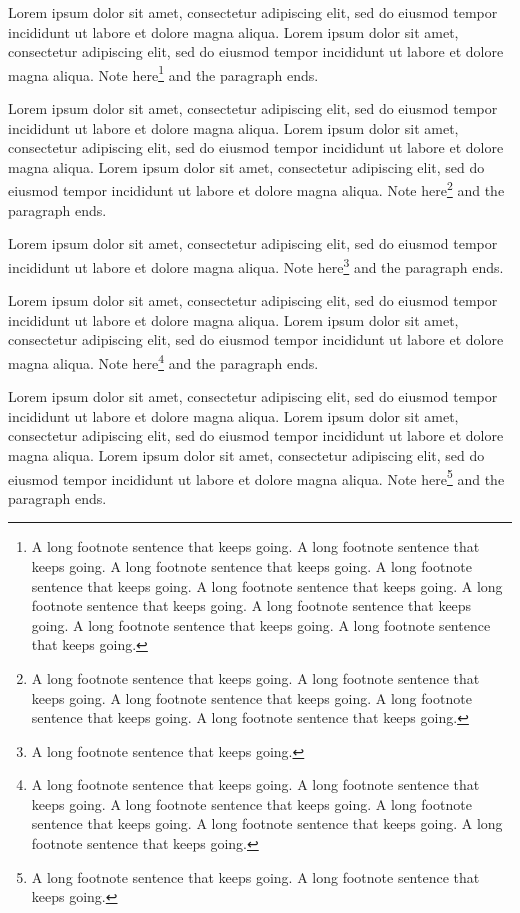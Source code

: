 \documentclass{article}
\begin{document}
Lorem ipsum dolor sit amet, consectetur adipiscing elit, sed do eiusmod tempor incididunt ut labore et dolore magna aliqua. Lorem ipsum dolor sit amet, consectetur adipiscing elit, sed do eiusmod tempor incididunt ut labore et dolore magna aliqua. Note here\footnote{A long footnote sentence that keeps going. A long footnote sentence that keeps going. A long footnote sentence that keeps going. A long footnote sentence that keeps going. A long footnote sentence that keeps going. A long footnote sentence that keeps going. A long footnote sentence that keeps going. A long footnote sentence that keeps going. A long footnote sentence that keeps going. } and the paragraph ends.

Lorem ipsum dolor sit amet, consectetur adipiscing elit, sed do eiusmod tempor incididunt ut labore et dolore magna aliqua. Lorem ipsum dolor sit amet, consectetur adipiscing elit, sed do eiusmod tempor incididunt ut labore et dolore magna aliqua. Lorem ipsum dolor sit amet, consectetur adipiscing elit, sed do eiusmod tempor incididunt ut labore et dolore magna aliqua. Note here\footnote{A long footnote sentence that keeps going. A long footnote sentence that keeps going. A long footnote sentence that keeps going. A long footnote sentence that keeps going. A long footnote sentence that keeps going. } and the paragraph ends.

Lorem ipsum dolor sit amet, consectetur adipiscing elit, sed do eiusmod tempor incididunt ut labore et dolore magna aliqua. Note here\footnote{A long footnote sentence that keeps going. } and the paragraph ends.

Lorem ipsum dolor sit amet, consectetur adipiscing elit, sed do eiusmod tempor incididunt ut labore et dolore magna aliqua. Lorem ipsum dolor sit amet, consectetur adipiscing elit, sed do eiusmod tempor incididunt ut labore et dolore magna aliqua. Note here\footnote{A long footnote sentence that keeps going. A long footnote sentence that keeps going. A long footnote sentence that keeps going. A long footnote sentence that keeps going. A long footnote sentence that keeps going. A long footnote sentence that keeps going. } and the paragraph ends.

Lorem ipsum dolor sit amet, consectetur adipiscing elit, sed do eiusmod tempor incididunt ut labore et dolore magna aliqua. Lorem ipsum dolor sit amet, consectetur adipiscing elit, sed do eiusmod tempor incididunt ut labore et dolore magna aliqua. Lorem ipsum dolor sit amet, consectetur adipiscing elit, sed do eiusmod tempor incididunt ut labore et dolore magna aliqua. Note here\footnote{A long footnote sentence that keeps going. A long footnote sentence that keeps going. } and the paragraph ends.
\end{document}
